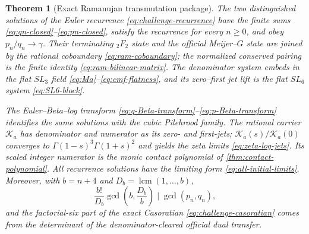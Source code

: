 \documentclass[11pt]{article}
\theoremstyle{keio}
\newtheorem{theorem}{Theorem}[section]
\theoremstyle{definition}
\theoremstyle{remark}
\newcommand{\lcm}{\operatorname{lcm}}
\begin{document}
\begin{theorem}[Exact Ramanujan transmutation package]
\label{thm:intro-recurrence}
The two distinguished solutions of the Euler recurrence
\eqref{eq:challenge-recurrence} have the finite sums
\eqref{eq:qn-closed}--\eqref{eq:pn-closed}, satisfy the recurrence for every
\(n\ge0\), and obey \(p_n/q_n\to\gamma\).  Their terminating
\({}_2F_2\) state and the official Meijer--\(G\) state are joined by the
rational coboundary \eqref{eq:ram-coboundary}; the normalized conserved
pairing is the finite identity \eqref{eq:ram-bilinear-matrix}.  The
denominator system embeds in the flat \(SL_3\) field
\eqref{eq:Ma}--\eqref{eq:cmf-flatness}, and its zero--first jet lift is the
flat \(SL_6\) system \eqref{eq:SL6-block}.

The Euler--Beta--log transform
\eqref{eq:q-Beta-transform}--\eqref{eq:p-Beta-transform} identifies the
same solutions with the cubic Pilehrood family.  The rational carrier
\(\mathscr K_a\) has denominator and numerator as its zero- and first-jets;
\(\mathscr K_a(s)/\mathscr K_a(0)\) converges to
\(\Gamma(1-s)^3\Gamma(1+s)^2\) and yields the zeta limits
\eqref{eq:zeta-log-jets}.  Its scaled integer numerator is the monic contact
polynomial of \cref{thm:contact-polynomial}.  All recurrence solutions have
the limiting form \eqref{eq:all-initial-limits}.  Moreover, with
\(b=n+4\) and \(D_b=\lcm(1,\ldots,b)\),
\[
 \frac{b!}{D_b}\gcd\!\left(b,\frac{D_b}{b}\right)
 \mid\gcd(p_n,q_n),
\]
and the factorial-six part of the exact Casoratian
\eqref{eq:challenge-casoratian} comes from the determinant of the
denominator-cleared official dual transfer.
\end{theorem}
\end{document}
